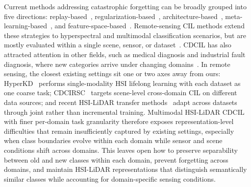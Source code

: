 Current methods addressing catastrophic forgetting can be broadly grouped into five directions: replay-based~\cite{rebuffi2017icarl,hou2019lucir,douillard2020podnet,wang2022foster}, regularization-based~\cite{kirkpatrick2017ewc,li2017lwf}, architecture-based~\cite{wang2022l2p,wang2022dualprompt,smith2023codaprompt,liang2024inflora}, meta-learning-based~\cite{yang2026pmpt,zhu2025pass}, and feature-space-based~\cite{petit2023fetril,mcdonnell2023ranpac,gomezvilla2024ldc}.
Remote-sensing CIL methods extend these strategies to hyperspectral and multimodal classification scenarios, but are mostly evaluated within a single scene, sensor, or dataset~\cite{deng2024dcprn,xu2025crossacl,zhang2024jfi_acl,li2026dfpem,yang2026pmpt}.
CDCIL has also attracted attention in other fields, such as medical diagnosis and industrial fault diagnosis, where new categories arrive under changing domains~\cite{yang2023cdfscil,shi2024cdcibn}.
In remote sensing, the closest existing settings sit one or two axes away from ours: HyperKD~\cite{li2025hyperkd} performs single-modality HSI lifelong learning with each dataset as one coarse task; CDCIRSC~\cite{zhang2024cdcirssc} targets scene-level cross-domain CIL on different data sources; and recent HSI-LiDAR transfer methods~\cite{liu2025prompt} adapt across datasets through joint rather than incremental training.
Multimodal HSI-LiDAR CDCIL with finer per-domain task granularity therefore exposes representation-level difficulties that remain insufficiently captured by existing settings, especially when class boundaries evolve within each domain while sensor and scene conditions shift across domains.
This leaves open how to preserve separability between old and new classes within each domain, prevent forgetting across domains, and maintain HSI-LiDAR representations that distinguish semantically similar classes while accounting for domain-specific sensing conditions.

